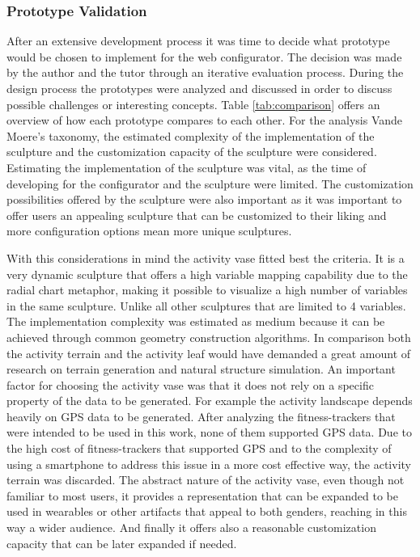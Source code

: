 \documentclass[../medieninformatik-arbeit.tex]{subfiles}
\begin{document}
\subsubsection{Prototype Validation}
After an extensive development process it was time to decide what prototype would be chosen to implement for the web configurator. The decision was made by the author and the tutor through an iterative evaluation process. During the design process the prototypes were analyzed and discussed in order to discuss possible challenges or interesting concepts. Table \ref{tab:comparison} offers an overview of how each prototype compares to each other. For the analysis Vande Moere's taxonomy, the estimated complexity of the implementation of the sculpture and the customization capacity of the sculpture were considered. Estimating the implementation of the sculpture was vital, as the time of developing for the configurator and the sculpture were limited. The customization possibilities offered by the sculpture were also important as it was important to offer users an appealing sculpture that can be customized to their liking and more configuration options mean more unique sculptures. 

With this considerations in mind the activity vase fitted best the criteria. It is a very dynamic sculpture that offers a high variable mapping capability due to the radial chart metaphor, making it possible to visualize a high number of variables in the same sculpture. Unlike all other sculptures that are limited to 4 variables. The implementation complexity was estimated as medium because it can be achieved through common geometry construction algorithms. In comparison both the activity terrain and the activity leaf would have demanded a great amount of research on terrain generation and natural structure simulation. An important factor for choosing the activity vase was that it does not rely on a specific property of the data to be generated. For example the activity landscape depends heavily on GPS data to be generated. After analyzing the fitness-trackers that were intended to be used in this work, none of them supported GPS data. Due to the high cost of fitness-trackers that supported GPS and to the complexity of using a smartphone to address this issue in a more cost effective way, the activity terrain was discarded. The abstract nature of the activity vase, even though not familiar to most users, it provides a representation that can be expanded to be used in wearables or other artifacts that appeal to both genders, reaching in this way a wider audience. And finally it offers also a reasonable customization capacity that can be later expanded if needed. 
\end{document}
